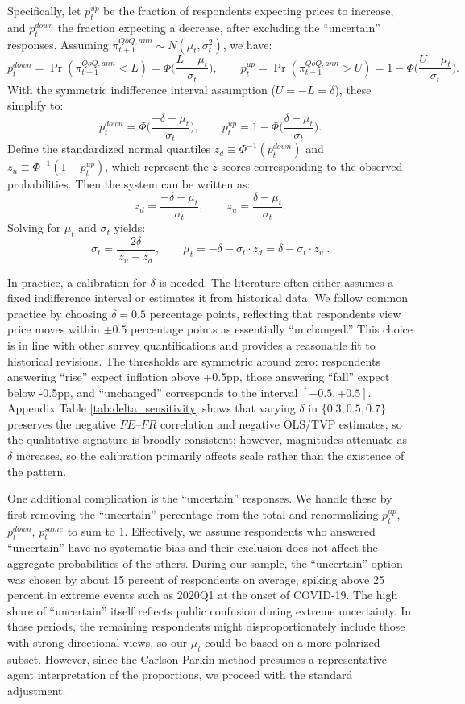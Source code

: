 \documentclass[12pt]{article}
\begin{document}
Specifically, let $p^{up}_t$ be the fraction of respondents expecting prices to increase, and $p^{down}_t$ the fraction expecting a decrease, after excluding the ``uncertain'' responses. Assuming $\pi^{QoQ,ann}_{t+1} \sim N(\mu_t, \sigma_t^2)$, we have:
\[
    p^{down}_t = \Pr(\pi^{QoQ,ann}_{t+1} < L) = \Phi\!\Big(\frac{L - \mu_t}{\sigma_t}\Big), \qquad
    p^{up}_t = \Pr(\pi^{QoQ,ann}_{t+1} > U) = 1 - \Phi\!\Big(\frac{U - \mu_t}{\sigma_t}\Big).
\]
With the symmetric indifference interval assumption ($U=-L=\delta$), these simplify to:
\[
    p^{down}_t = \Phi\!\Big(\frac{-\delta - \mu_t}{\sigma_t}\Big), \qquad
    p^{up}_t = 1 - \Phi\!\Big(\frac{\delta - \mu_t}{\sigma_t}\Big).
\]
Define the standardized normal quantiles $z_d \equiv \Phi^{-1}(p^{down}_t)$ and $z_u \equiv \Phi^{-1}(1 - p^{up}_t)$, which represent the $z$-scores corresponding to the observed probabilities. Then the system can be written as:
\[
    z_d = \frac{-\delta - \mu_t}{\sigma_t}, \qquad z_u = \frac{\delta - \mu_t}{\sigma_t}.
\]
Solving for $\mu_t$ and $\sigma_t$ yields:
\[
    \sigma_t = \frac{2\delta}{\,z_u - z_d\,}, \qquad
    \mu_t = -\delta - \sigma_t \cdot z_d = \delta - \sigma_t \cdot z_u~.
\]

In practice, a calibration for $\delta$ is needed. The literature often either assumes a fixed indifference interval or estimates it from historical data. We follow common practice by choosing $\delta = 0.5$ percentage points, reflecting that respondents view price moves within $\pm 0.5$ percentage points as essentially ``unchanged.'' This choice is in line with other survey quantifications and provides a reasonable fit to historical revisions. The thresholds are symmetric around zero: respondents answering ``rise'' expect inflation above +0.5pp, those answering ``fall'' expect below -0.5pp, and ``unchanged'' corresponds to the interval $[-0.5, +0.5]$. Appendix Table \ref{tab:delta_sensitivity} shows that varying $\delta$ in $\{0.3, 0.5, 0.7\}$ preserves the negative $FE$--$FR$ correlation and negative OLS/TVP estimates, so the qualitative signature is broadly consistent; however, magnitudes attenuate as $\delta$ increases, so the calibration primarily affects scale rather than the existence of the pattern.

One additional complication is the ``uncertain'' responses. We handle these by first removing the ``uncertain'' percentage from the total and renormalizing $p^{up}_t$, $p^{down}_t$, $p^{same}_t$ to sum to 1. Effectively, we assume respondents who answered ``uncertain'' have no systematic bias and their exclusion does not affect the aggregate probabilities of the others. During our sample, the ``uncertain'' option was chosen by about 15 percent of respondents on average, spiking above 25 percent in extreme events such as 2020Q1 at the onset of COVID-19. The high share of ``uncertain'' itself reflects public confusion during extreme uncertainty. In those periods, the remaining respondents might disproportionately include those with strong directional views, so our $\mu_t$ could be based on a more polarized subset. However, since the Carlson-Parkin method presumes a representative agent interpretation of the proportions, we proceed with the standard adjustment.
\end{document}
